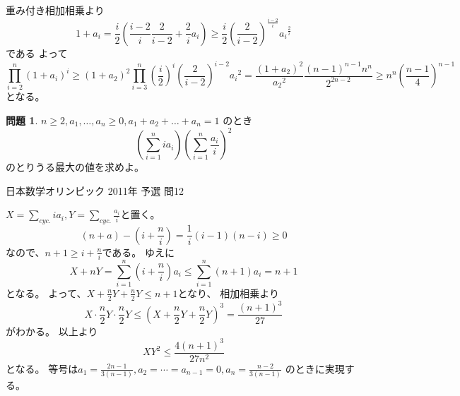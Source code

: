 \documentclass[uplatex, a5paper]{jsarticle}
\makeatletter
\theoremstyle{definition}
\newtheorem{prob}{問題}
\renewenvironment{proof}[1][\proofname]{
  \pushQED{\qed}%
  \normalfont \topsep6\p@\@plus6\p@\relax
  \trivlist
  \item[\hskip\labelsep
    #1\@addpunct{\textbf{.}}]\ignorespaces
}{%
  \popQED\endtrivlist\@endpefalse
}
\providecommand{\proofname}{証明}
\def\qed{\hfill $\Box$}
\makeatother
\begin{document}
\begin{proof}
  重み付き相加相乗より
  \[
  1+a_i
  = \frac{i}{2}\left( \frac{i-2}{i} \frac{2}{i-2} + \frac{2}{i}a_i \right)
  \geq \frac{i}{2}\left( \frac{2}{i-2} \right) ^{ \frac{i-2}{i} } {a_i}^{\frac{2}{i}}
  \]
  である
  よって
  \[
  \prod_{i=2}^n (1+a_i)^i
  \geq (1+a_2)^2 \prod_{i=3}^n \left( \frac{i}{2}\right) ^i \left( \frac{2}{i-2} \right) ^{i-2} {a_i}^2
  = \frac{(1+a_2)^2}{{a_2}^2} \frac{(n-1)^{n-1}n^n}{2^{2n-2}}
  \geq n^n \left( \frac{n-1}{4} \right) ^{n-1}
  \]
  となる。
\end{proof}














\newpage

\begin{prob}
  \(n \geq 2 , a_1 , \ldots , a_n \geq 0 , a_1 + a_2 + \ldots + a_n = 1\)
  のとき
  \[
  \left( \sum_{i=1}^n ia_i \right) \left( \sum_{i=1}^n \frac{a_i}{i} \right) ^2
  \]
  のとりうる最大の値を求めよ。
  \begin{flushright}
    日本数学オリンピック 2011年 予選 問12
  \end{flushright}
\end{prob}


\begin{proof}
  \(X= \displaystyle\sum_{cyc.} ia_i , Y= \displaystyle\sum_{cyc.} \frac{a_i}{i}\)と置く。
  \[
  (n+a) - \left( i + \frac{n}{i} \right) = \frac{1}{i}(i-1)(n-i) \geq 0
  \]
  なので、\(n+1\geq i + \displaystyle\frac{n}{i}\)である。
  ゆえに
  \[
  X+nY = \sum_{i=1}^n \left( i+ \frac{n}{i} \right) a_i \leq \sum_{i=1}^n (n+1)a_i = n+1
  \]
  となる。
  よって、\(X+\displaystyle\frac{n}{2}Y+\displaystyle\frac{n}{2}Y\leq n+1\)となり、
  相加相乗より
  \[
  X \cdot \frac{n}{2}Y \cdot \frac{n}{2}Y
  \leq \left( X + \frac{n}{2}Y + \frac{n}{2}Y \right) ^3
  = \frac{(n+1)^3}{27}
  \]
  がわかる。
  以上より
  \[
  XY^2 \leq \frac{4(n+1)^3}{27n^2}
  \]
  となる。
  等号は\(a_1=\displaystyle\frac{2n-1}{3(n-1)} , a_2=\cdots = a_{n-1}=0 , a_n=\displaystyle\frac{n-2}{3(n-1)}\)
  のときに実現する。
\end{proof}












\newpage
\end{document}
